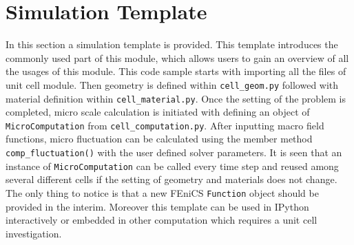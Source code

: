 \documentclass[10pt,a4paper]{scrreprt}
\begin{document}
\section{Simulation Template}
In this section a simulation template is provided. This template introduces the commonly used part of this module, which allows users to gain an overview of all the usages of this module. This code sample starts with importing all the files of unit cell module. Then geometry is defined within \texttt{cell\_geom.py} followed with material definition within \texttt{cell\_material.py}. Once the setting of the problem is completed, micro scale calculation is initiated with defining an object of \texttt{MicroComputation} from \texttt{cell\_computation.py}. After inputting macro field functions, micro fluctuation can be calculated using the member method \texttt{comp\_fluctuation()} with the user defined solver parameters. It is seen that an instance of \texttt{MicroComputation} can be called every time step and reused among several different cells if the setting of geometry and materials does not change. The only thing to notice is that a new FEniCS \texttt{Function} object should be provided in the interim. Moreover this template can be used in IPython interactively or embedded in other computation which requires a unit cell investigation.
\end{document}
